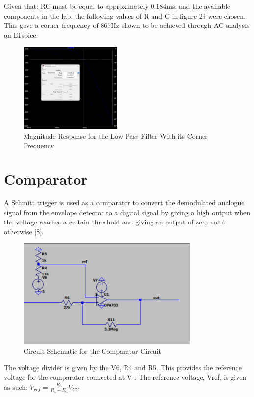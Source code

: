Given that: RC must be equal to approximately 0.184ms; and the available components in the lab, the following values of R and C in figure 29 were chosen. This gave a corner frequency of 867Hz shown to be achieved through AC analysis on LTspice.
\begin{figure}[H]
    \centering
    \includegraphics[width=0.45\textwidth]{subpages/images/ultra_lp.png}
    \caption{Magnitude Response for the Low-Pass Filter With its Corner Frequency}
    \label{fig:mag_response_lp}
\end{figure}

\section{Comparator}
A Schmitt trigger is used as a comparator to convert the demodulated analogue signal from the envelope detector to a digital signal by giving a high output when the voltage reaches a certain threshold and giving an output of zero volts otherwise [8].
\begin{figure}[h]
    \centering
    \includegraphics[width=0.8\textwidth]{subpages/images/ultra_comparator.png}
    \caption{Circuit Schematic for the Comparator Circuit}
    \label{fig:comparator}
\end{figure}

The voltage divider is given by the V6, R4 and R5. This provides the reference voltage for the comparator connected at V-. The reference voltage, Vref, is given as such: \(V_{ref}  = \frac{R_5}{R_5 + R_6}V_{CC}\)

